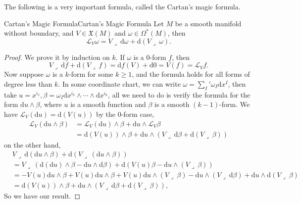 \documentclass[../main.tex]{subfiles}
\begin{document}
The following is a very important formula, called the Cartan's magic formula.
\begin{theorem}{Cartan's Magic Formula}{Cartan's Magic Formula}
  Let $M$ be a smooth manifold without boundary, and $V \in \mathfrak{X}(M)$ and $\omega \in \Omega^*(M)$, then
  \begin{equation*}
    \mathcal{L}_V \omega = V \lrcorner \ \mathrm{d} \omega + \mathrm{d} (V \lrcorner \ \omega).
  \end{equation*}
\end{theorem}
\begin{proof}
  We prove it by induction on $k$. If $\omega$ is a 0-form $f$, then
  \begin{equation*}
    V \lrcorner \ \mathrm{d} f + \mathrm{d} (V \lrcorner \ f) = \mathrm{d} f(V) + \mathrm{d} 0 = V(f) = \mathcal{L}_V f.
  \end{equation*}
  Now suppose $\omega$ is a $k$-form for some $k \geq 1$, and the formula holds for all forms of degree less than $k$. In some coordinate chart, we can write $\omega = \sum_I^{}' \omega_I \mathrm{d} x^I$, then take $u = x^{i_1}, \beta = \omega_I \mathrm{d} x^{i_2} \wedge \cdots \wedge \mathrm{d} x^{i_k}$, all we need to do is verify the formula for the form $ \mathrm{d} u \wedge \beta$, where $u$ is a smooth function and $\beta$ is a smooth $(k-1)$-form. We have $\mathcal{L}_V (\mathrm{d} u) = \mathrm{d} (V(u))$ by the 0-form case,
  \begin{equation*}
    \begin{aligned}
      \mathcal{L}_V (\mathrm{d} u \wedge \beta) &= \mathcal{L}_V (\mathrm{d} u) \wedge \beta + \mathrm{d} u \wedge \mathcal{L}_V \beta\\
      &= \mathrm{d} (V(u)) \wedge \beta + \mathrm{d} u \wedge (V \lrcorner \ \mathrm{d} \beta + \mathrm{d} (V \lrcorner \ \beta))
    \end{aligned}
  \end{equation*}
  on the other hand,
  \begin{equation*}
    \begin{aligned}
      & V \lrcorner \ \mathrm{d} (\mathrm{d} u \wedge \beta) + \mathrm{d} (V \lrcorner \ (\mathrm{d} u \wedge \beta))\\
      &=  V \lrcorner \ (\mathrm{d} (\mathrm{d} u) \wedge \beta - \mathrm{d} u \wedge \mathrm{d} \beta) + \mathrm{d} (V(u) \beta - \mathrm{d} u \wedge (V \lrcorner \ \beta))\\
      &=  -V(u) \mathrm{d} u \wedge \beta + V(u) \mathrm{d} u \wedge \beta + V(u) \mathrm{d} u \wedge (V \lrcorner \ \beta) - \mathrm{d} u \wedge (V \lrcorner \ \mathrm{d} \beta) + \mathrm{d} u \wedge \mathrm{d} (V \lrcorner \ \beta)\\
      &=  \mathrm{d} (V(u)) \wedge \beta + \mathrm{d} u \wedge (V \lrcorner \ \mathrm{d} \beta + \mathrm{d} (V \lrcorner \ \beta)),
    \end{aligned}
  \end{equation*}
  So we have our result.
\end{proof}
\end{document}
